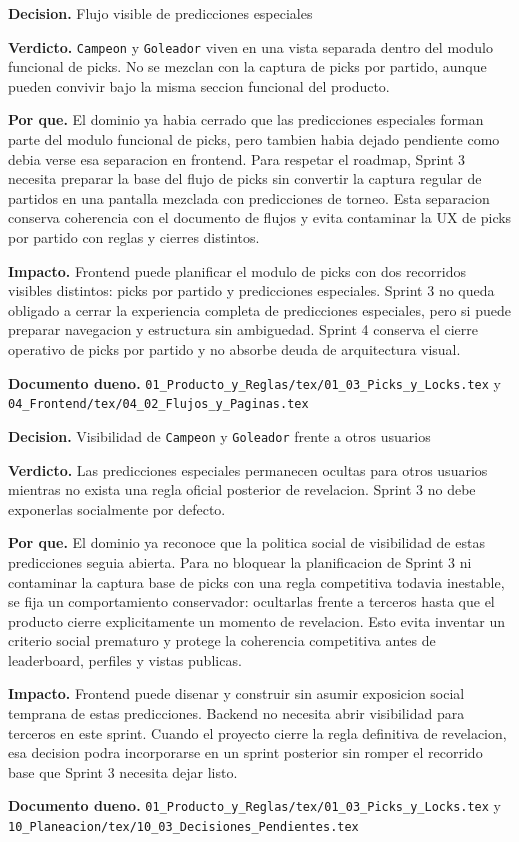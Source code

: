 \begin{docnote}
\textbf{Decision.} Flujo visible de predicciones especiales

\textbf{Verdicto.} \texttt{Campeon} y \texttt{Goleador} viven en una vista separada dentro del modulo funcional de picks. No se mezclan con la captura de picks por partido, aunque pueden convivir bajo la misma seccion funcional del producto.

\textbf{Por que.} El dominio ya habia cerrado que las predicciones especiales forman parte del modulo funcional de picks, pero tambien habia dejado pendiente como debia verse esa separacion en frontend. Para respetar el roadmap, Sprint 3 necesita preparar la base del flujo de picks sin convertir la captura regular de partidos en una pantalla mezclada con predicciones de torneo. Esta separacion conserva coherencia con el documento de flujos y evita contaminar la UX de picks por partido con reglas y cierres distintos.

\textbf{Impacto.} Frontend puede planificar el modulo de picks con dos recorridos visibles distintos: picks por partido y predicciones especiales. Sprint 3 no queda obligado a cerrar la experiencia completa de predicciones especiales, pero si puede preparar navegacion y estructura sin ambiguedad. Sprint 4 conserva el cierre operativo de picks por partido y no absorbe deuda de arquitectura visual.

\textbf{Documento dueno.} \texttt{01\_Producto\_y\_Reglas/tex/01\_03\_Picks\_y\_Locks.tex} y \texttt{04\_Frontend/tex/04\_02\_Flujos\_y\_Paginas.tex}
\end{docnote}

\begin{docnote}
\textbf{Decision.} Visibilidad de \texttt{Campeon} y \texttt{Goleador} frente a otros usuarios

\textbf{Verdicto.} Las predicciones especiales permanecen ocultas para otros usuarios mientras no exista una regla oficial posterior de revelacion. Sprint 3 no debe exponerlas socialmente por defecto.

\textbf{Por que.} El dominio ya reconoce que la politica social de visibilidad de estas predicciones seguia abierta. Para no bloquear la planificacion de Sprint 3 ni contaminar la captura base de picks con una regla competitiva todavia inestable, se fija un comportamiento conservador: ocultarlas frente a terceros hasta que el producto cierre explicitamente un momento de revelacion. Esto evita inventar un criterio social prematuro y protege la coherencia competitiva antes de leaderboard, perfiles y vistas publicas.

\textbf{Impacto.} Frontend puede disenar y construir sin asumir exposicion social temprana de estas predicciones. Backend no necesita abrir visibilidad para terceros en este sprint. Cuando el proyecto cierre la regla definitiva de revelacion, esa decision podra incorporarse en un sprint posterior sin romper el recorrido base que Sprint 3 necesita dejar listo.

\textbf{Documento dueno.} \texttt{01\_Producto\_y\_Reglas/tex/01\_03\_Picks\_y\_Locks.tex} y \texttt{10\_Planeacion/tex/10\_03\_Decisiones\_Pendientes.tex}
\end{docnote}

